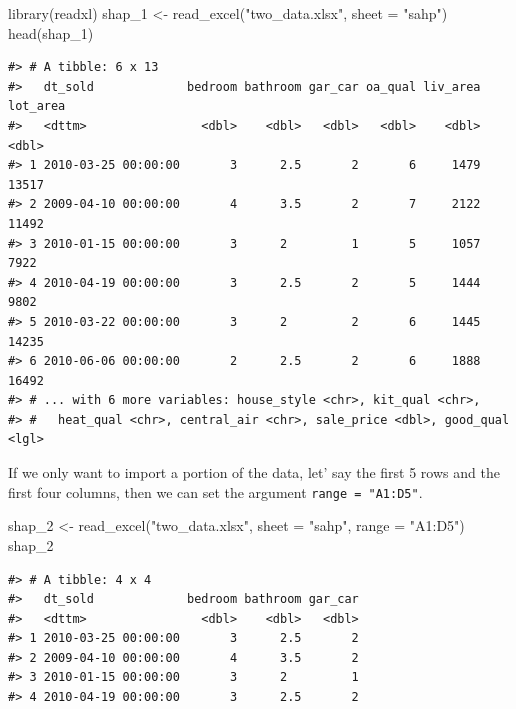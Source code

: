 \documentclass[
]{book}
\newenvironment{Shaded}{\begin{snugshade}}{\end{snugshade}}
\newcommand{\AttributeTok}[1]{\textcolor[rgb]{0.77,0.63,0.00}{#1}}
\newcommand{\FunctionTok}[1]{\textcolor[rgb]{0.00,0.00,0.00}{#1}}
\newcommand{\NormalTok}[1]{#1}
\newcommand{\OtherTok}[1]{\textcolor[rgb]{0.56,0.35,0.01}{#1}}
\newcommand{\StringTok}[1]{\textcolor[rgb]{0.31,0.60,0.02}{#1}}
\begin{document}
\begin{Shaded}
\begin{Highlighting}[]
\FunctionTok{library}\NormalTok{(readxl)}
\NormalTok{shap\_1 }\OtherTok{\textless{}{-}} \FunctionTok{read\_excel}\NormalTok{(}\StringTok{"two\_data.xlsx"}\NormalTok{, }\AttributeTok{sheet =} \StringTok{"sahp"}\NormalTok{)}
\FunctionTok{head}\NormalTok{(shap\_1)}
\end{Highlighting}
\end{Shaded}

\begin{verbatim}
#> # A tibble: 6 x 13
#>   dt_sold             bedroom bathroom gar_car oa_qual liv_area lot_area
#>   <dttm>                <dbl>    <dbl>   <dbl>   <dbl>    <dbl>    <dbl>
#> 1 2010-03-25 00:00:00       3      2.5       2       6     1479    13517
#> 2 2009-04-10 00:00:00       4      3.5       2       7     2122    11492
#> 3 2010-01-15 00:00:00       3      2         1       5     1057     7922
#> 4 2010-04-19 00:00:00       3      2.5       2       5     1444     9802
#> 5 2010-03-22 00:00:00       3      2         2       6     1445    14235
#> 6 2010-06-06 00:00:00       2      2.5       2       6     1888    16492
#> # ... with 6 more variables: house_style <chr>, kit_qual <chr>,
#> #   heat_qual <chr>, central_air <chr>, sale_price <dbl>, good_qual <lgl>
\end{verbatim}

If we only want to import a portion of the data, let' say the first 5 rows and the first four columns, then we can set the argument \texttt{range\ =\ "A1:D5"}.

\begin{Shaded}
\begin{Highlighting}[]
\NormalTok{shap\_2 }\OtherTok{\textless{}{-}} \FunctionTok{read\_excel}\NormalTok{(}\StringTok{"two\_data.xlsx"}\NormalTok{, }\AttributeTok{sheet =} \StringTok{"sahp"}\NormalTok{, }\AttributeTok{range =} \StringTok{"A1:D5"}\NormalTok{)}
\NormalTok{shap\_2}
\end{Highlighting}
\end{Shaded}

\begin{verbatim}
#> # A tibble: 4 x 4
#>   dt_sold             bedroom bathroom gar_car
#>   <dttm>                <dbl>    <dbl>   <dbl>
#> 1 2010-03-25 00:00:00       3      2.5       2
#> 2 2009-04-10 00:00:00       4      3.5       2
#> 3 2010-01-15 00:00:00       3      2         1
#> 4 2010-04-19 00:00:00       3      2.5       2
\end{verbatim}
\end{document}
